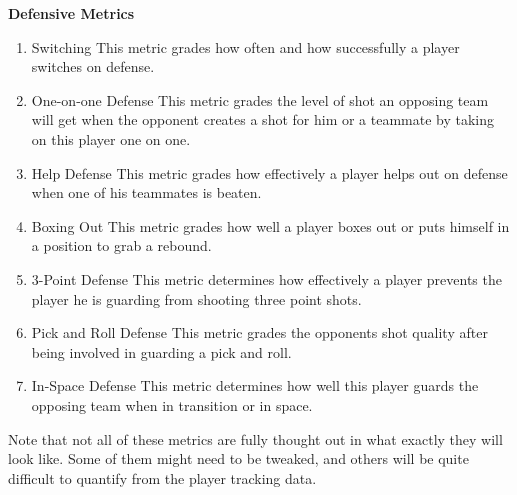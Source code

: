 \documentclass{article}
\begin{document}
\noindent \textbf{Defensive Metrics}
\begin{enumerate}[nolistsep]%
\item Switching
\subitem This metric grades how often and how successfully a player switches
\subitem on defense.
\item One-on-one Defense
\subitem This metric grades the level of shot an opposing team will get when
\subitem the opponent creates a shot for him or a teammate by taking on this
\subitem player one on one.
\item Help Defense
\subitem This metric grades how effectively a player helps out on defense when
\subitem one of his teammates is beaten.
\item Boxing Out
\subitem This metric grades how well a player boxes out or puts himself in a 
\subitem position to grab a rebound.
\item 3-Point Defense
\subitem This metric determines how effectively a player prevents the player
\subitem he is guarding from shooting three point shots.
\item Pick and Roll Defense
\subitem This metric grades the opponents shot quality after being involved
\subitem in guarding a pick and roll.
\item In-Space Defense
\subitem This metric determines how well this player guards the opposing team
\subitem when in transition or in space.
\end{enumerate}

\noindent Note that not all of these metrics are fully thought out in what exactly they will look like.  Some of them might need to be tweaked, and others will be quite difficult to quantify from the player tracking data.
\end{document}
